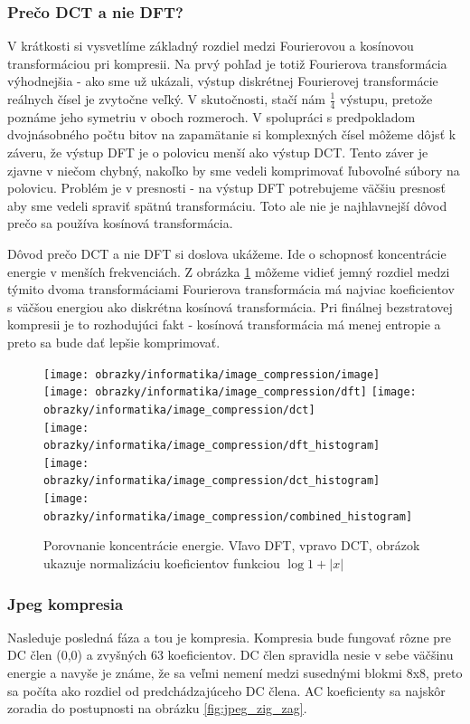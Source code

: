 \subsubsection{Prečo DCT a nie DFT?}
 V krátkosti si vysvetlíme základný rozdiel medzi Fourierovou a
 kosínovou transformáciou pri kompresii. Na prvý pohľad je totiž
 Fourierova transformácia výhodnejšia - ako sme už ukázali, výstup
 diskrétnej Fourierovej transformácie reálnych čísel je zvytočne
 veľký. V skutočnosti, stačí nám $\frac{1}{4}$ výstupu, pretože
 poznáme jeho symetriu v oboch rozmeroch. V spolupráci s predpokladom
 dvojnásobného počtu bitov na zapamätanie si komplexných čísel môžeme
 dôjsť k záveru, že výstup DFT je o polovicu menší ako výstup DCT.
 Tento záver je zjavne v niečom chybný, nakoľko by sme vedeli
 komprimovať ľubovoľné súbory na polovicu. Problém je v  presnosti -
 na výstup DFT potrebujeme väčšiu presnosť aby sme vedeli spraviť
 spätnú transformáciu. Toto ale nie je najhlavnejší dôvod prečo sa
 používa kosínová transformácia.

 Dôvod  prečo DCT a nie DFT si doslova ukážeme.
 Ide o schopnosť koncentrácie energie
 v menších frekvenciách. Z obrázka \ref{fig:dct_vs_dft}
 môžeme vidieť jemný rozdiel medzi týmito dvoma transformáciami
 Fourierova transformácia má najviac koeficientov s väčšou energiou
 ako diskrétna kosínová transformácia. Pri finálnej
 bezstratovej kompresii je to rozhodujúci fakt - kosínová
 transformácia má menej entropie a preto sa bude dať lepšie
 komprimovať.

 
\begin{figure}[htp]
    \centering
    \texttt{[image: obrazky/informatika/image\_compression/image]} \\
    \texttt{[image: obrazky/informatika/image\_compression/dft]}
    \texttt{[image: obrazky/informatika/image\_compression/dct]} \\
    \texttt{[image: obrazky/informatika/image\_compression/dft\_histogram]}
    \texttt{[image: obrazky/informatika/image\_compression/dct\_histogram]}
    \texttt{[image: obrazky/informatika/image\_compression/combined\_histogram]}
    \caption{Porovnanie koncentrácie energie. Vľavo DFT, vpravo DCT,
    obrázok ukazuje normalizáciu koeficientov funkciou $\log 1+|x|$}
    \label{fig:dct_vs_dft}
\end{figure}

\subsubsection{Jpeg kompresia }
Nasleduje posledná fáza a tou je kompresia. Kompresia bude fungovať
rôzne pre DC člen (0,0) a zvyšných 63 koeficientov. DC člen spravidla nesie v
sebe väčšinu energie a navyše je známe, že sa veľmi nemení medzi
susednými blokmi 8x8, preto sa počíta ako rozdiel od predchádzajúceho
DC člena. AC koeficienty sa najskôr zoradia do 
postupnosti na obrázku \ref{fig:jpeg_zig_zag}. 

